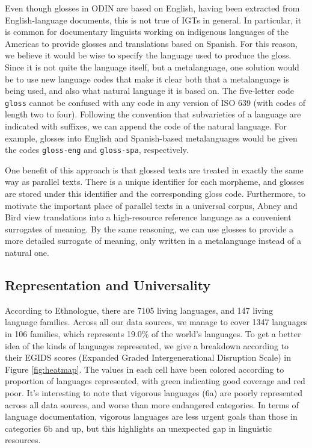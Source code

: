 Even though glosses in ODIN are based on English, having been
extracted from English-language documents, this is not true of IGTs in
general.  In particular, it is common for documentary linguists
working on indigenous languages of the Americas to provide glosses and
translations based on Spanish.  For this reason, we believe it would
be wise to specify the language used to produce the gloss.  Since it
is not quite the language itself, but a metalanguage, one solution
would be to use new language codes that make it clear both that a
metalanguage is being used, and also what natural language it is based
on.  The five-letter code \texttt{gloss} cannot be confused with any
code in any version of ISO 639 (with codes of length two to
four).  Following the convention that subvarieties of a language are
indicated with suffixes, we can append the code of the natural
language.  For example, glosses into English and
Spanish-based metalanguages would be given the codes
\texttt{gloss-eng} and \texttt{gloss-spa}, respectively.

One benefit of this approach is that glossed texts are treated in exactly the same way as parallel texts.  There is a unique identifier for each morpheme, and glosses are stored under this identifier and the corresponding gloss code.  Furthermore, to motivate the important place of parallel texts in a universal corpus, Abney and Bird view translations into a high-resource reference language as a convenient surrogates of meaning. By the same reasoning, we can use glosses to provide a more detailed surrogate of meaning, only written in a metalanguage instead of a natural one.



\subsection{Representation and Universality} \label{sec:stats}

According to Ethnologue, there are 7105 living languages, and 147
living language families. Across all our data sources, we manage to
cover 1347 languages in 106 families, which represents 19.0\% of the
world's languages. To get a better idea of the kinds of languages
represented, we give a breakdown according to their EGIDS scores
(Expanded Graded Intergenerational Disruption Scale)
\cite{lewis2010assessing} in Figure \ref{fig:heatmap}. The values in
each cell have been colored according to proportion of languages
represented, with green indicating good coverage and red poor. It's
interesting to note that vigorous languages (6a) are poorly
represented across all data sources, and worse than more endangered
categories. In terms of language documentation, vigorous languages are
less urgent goals than those in categories 6b and up, but this
highlights an unexpected gap in linguistic resources.

